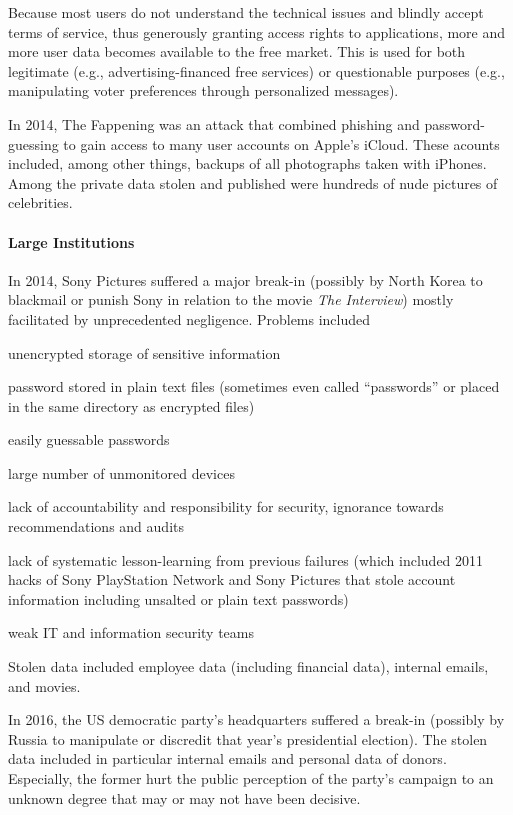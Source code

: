 Because most users do not understand the technical issues and blindly accept terms of service, thus generously granting access rights to applications, more and more user data becomes available to the free market.
This is used for both legitimate (e.g., advertising-financed free services) or questionable purposes (e.g., manipulating voter preferences through personalized messages).

In 2014, The Fappening was an attack that combined phishing and password-guessing to gain access to many user accounts on Apple's iCloud.
These acounts included, among other things, backups of all photographs taken with iPhones.
Among the private data stolen and published were hundreds of nude pictures of celebrities.

\paragraph{Large Institutions}
In 2014, Sony Pictures suffered a major break-in (possibly by North Korea to blackmail or punish Sony in relation to the movie \emph{The Interview}) mostly facilitated by unprecedented negligence.
Problems included
\begin{compactitem}
 \item unencrypted storage of sensitive information
 \item password stored in plain text files (sometimes even called ``passwords'' or placed in the same directory as encrypted files)
 \item easily guessable passwords
 \item large number of unmonitored devices
 \item lack of accountability and responsibility for security, ignorance towards recommendations and audits
 \item lack of systematic lesson-learning from previous failures (which included 2011 hacks of Sony PlayStation Network and Sony Pictures that stole account information including unsalted or plain text passwords)
 \item weak IT and information security teams
\end{compactitem}
Stolen data included employee data (including financial data), internal emails, and movies.
\medskip

In 2016, the US democratic party's headquarters suffered a break-in (possibly by Russia to manipulate or discredit that year's presidential election).
The stolen data included in particular internal emails and personal data of donors.
Especially, the former hurt the public perception of the party's campaign to an unknown degree that may or may not have been decisive.

